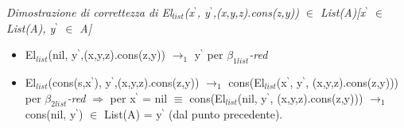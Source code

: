 \begin{adjustwidth}{-7em}{}
\begin{prooftree}
\end{prooftree}
\end{adjustwidth}
\vspace{0.5cm}
\noindent
\normalsize \textit{Dimostrazione di correttezza di El$_{list}$(x$^\backprime$, y$^\backprime$,(x,y,z).cons(z,y)) $\in$ List(A)[x$^\backprime$ $\in$ List(A), y$^\backprime$ $\in$ A]}
\begin{itemize}
\item El$_{list}$(nil, y$^\backprime$,(x,y,z).cons(z,y)) $\rightarrow_1$ y$^\backprime$ per \textit{$\beta_{1list}$-red}
\item El$_{list}$(cons(s,x$^\backprime$), y$^\backprime$,(x,y,z).cons(z,y)) $\rightarrow_1$ cons(El$_{list}$(x$^\backprime$, y$^\backprime$, (x,y,z).cons(z,y))) per \textit{$\beta_{2list}$-red} $\Rightarrow$ per x$^\backprime$ = nil $\equiv$ cons(El$_{list}$(nil, y$^\backprime$, (x,y,z).cons(z,y))) $\rightarrow_1$ cons(nil, y$^\backprime$) $\in$ List(A) = y$^\backprime$ (dal punto precedente).
\end{itemize}



